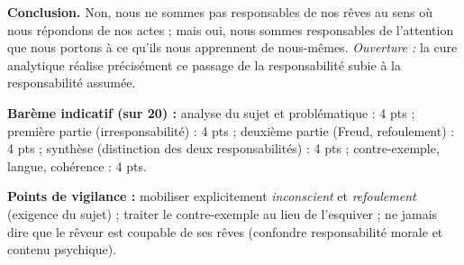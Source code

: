 \documentclass[11pt]{article}
\begin{document}
\begin{corrige}
\textbf{Conclusion.} Non, nous ne sommes pas responsables de nos rêves au sens où nous répondons de nos actes ; mais oui, nous sommes responsables de l'attention que nous portons à ce qu'ils nous apprennent de nous-mêmes. \emph{Ouverture :} la cure analytique réalise précisément ce passage de la responsabilité subie à la responsabilité assumée.

\textbf{Barème indicatif (sur 20) :} analyse du sujet et problématique : 4 pts ; première partie (irresponsabilité) : 4 pts ; deuxième partie (Freud, refoulement) : 4 pts ; synthèse (distinction des deux responsabilités) : 4 pts ; contre-exemple, langue, cohérence : 4 pts.

\textbf{Points de vigilance :} mobiliser explicitement \emph{inconscient} et \emph{refoulement} (exigence du sujet) ; traiter le contre-exemple au lieu de l'esquiver ; ne jamais dire que le rêveur est coupable de ses rêves (confondre responsabilité morale et contenu psychique).
\end{corrige}
\end{document}
